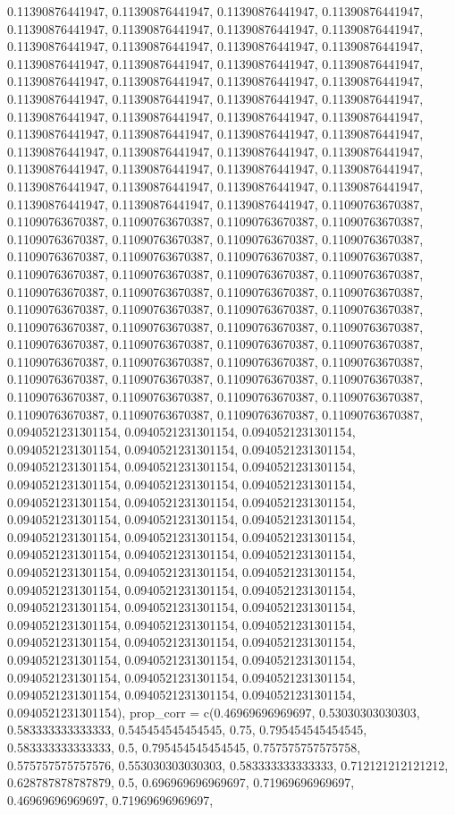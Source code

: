 \documentclass[
  man,floatsintext]{apa6}
\begin{document}
0.11390876441947, 0.11390876441947, 0.11390876441947, 0.11390876441947, 0.11390876441947, 0.11390876441947, 0.11390876441947, 0.11390876441947, 0.11390876441947, 0.11390876441947, 0.11390876441947, 0.11390876441947, 0.11390876441947, 0.11390876441947, 0.11390876441947, 0.11390876441947, 0.11390876441947, 0.11390876441947, 0.11390876441947, 0.11390876441947, 0.11390876441947, 0.11390876441947, 0.11390876441947, 0.11390876441947, 0.11390876441947, 0.11390876441947, 0.11390876441947, 0.11390876441947,
0.11390876441947, 0.11390876441947, 0.11390876441947, 0.11390876441947, 0.11390876441947, 0.11390876441947, 0.11390876441947, 0.11390876441947, 0.11390876441947, 0.11390876441947, 0.11390876441947, 0.11390876441947, 0.11390876441947, 0.11390876441947, 0.11390876441947, 0.11390876441947, 0.11390876441947, 0.11390876441947, 0.11390876441947, 0.11090763670387, 0.11090763670387, 0.11090763670387, 0.11090763670387, 0.11090763670387, 0.11090763670387, 0.11090763670387, 0.11090763670387, 0.11090763670387,
0.11090763670387, 0.11090763670387, 0.11090763670387, 0.11090763670387, 0.11090763670387, 0.11090763670387, 0.11090763670387, 0.11090763670387, 0.11090763670387, 0.11090763670387, 0.11090763670387, 0.11090763670387, 0.11090763670387, 0.11090763670387, 0.11090763670387, 0.11090763670387, 0.11090763670387, 0.11090763670387, 0.11090763670387, 0.11090763670387, 0.11090763670387, 0.11090763670387, 0.11090763670387, 0.11090763670387, 0.11090763670387, 0.11090763670387, 0.11090763670387, 0.11090763670387,
0.11090763670387, 0.11090763670387, 0.11090763670387, 0.11090763670387, 0.11090763670387, 0.11090763670387, 0.11090763670387, 0.11090763670387, 0.11090763670387, 0.11090763670387, 0.11090763670387, 0.11090763670387, 0.0940521231301154, 0.0940521231301154, 0.0940521231301154, 0.0940521231301154, 0.0940521231301154, 0.0940521231301154, 0.0940521231301154, 0.0940521231301154, 0.0940521231301154, 0.0940521231301154, 0.0940521231301154, 0.0940521231301154, 0.0940521231301154, 0.0940521231301154, 0.0940521231301154,
0.0940521231301154, 0.0940521231301154, 0.0940521231301154, 0.0940521231301154, 0.0940521231301154, 0.0940521231301154, 0.0940521231301154, 0.0940521231301154, 0.0940521231301154, 0.0940521231301154, 0.0940521231301154, 0.0940521231301154, 0.0940521231301154, 0.0940521231301154, 0.0940521231301154, 0.0940521231301154, 0.0940521231301154, 0.0940521231301154, 0.0940521231301154, 0.0940521231301154, 0.0940521231301154, 0.0940521231301154, 0.0940521231301154, 0.0940521231301154, 0.0940521231301154, 0.0940521231301154,
0.0940521231301154, 0.0940521231301154, 0.0940521231301154, 0.0940521231301154, 0.0940521231301154, 0.0940521231301154, 0.0940521231301154, 0.0940521231301154), prop\_corr = c(0.46969696969697, 0.53030303030303, 0.583333333333333, 0.545454545454545, 0.75, 0.795454545454545, 0.583333333333333, 0.5, 0.795454545454545, 0.757575757575758, 0.575757575757576, 0.553030303030303, 0.583333333333333, 0.712121212121212, 0.628787878787879, 0.5, 0.696969696969697, 0.71969696969697, 0.46969696969697, 0.71969696969697,
\end{document}
